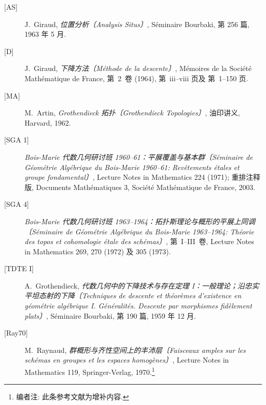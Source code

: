 \begin{description}
  \item[{[AS]}] J.~Giraud, \emph{位置分析〔Analysis Situs〕}, S\'eminaire Bourbaki,
    第 256 篇, 1963 年 5 月.

  \item[{[D]}] J.~Giraud, \emph{下降方法〔M\'ethode de la descente〕}, M\'emoires de la
    Soci\'et\'e Math\'ematique de France, 第~2~卷 (1964), 第~iii--viii 页及
    第~1--150 页.

  \item[{[MA]}] M.~Artin, \emph{Grothendieck 拓扑〔Grothendieck Topologies〕}, 油印讲义,
    Harvard, 1962.

  \item[{[SGA 1]}] \emph{Bois-Marie 代数几何研讨班 1960--61：平展覆盖与基本群〔S\'eminaire de G\'eom\'etrie Alg\'ebrique du
    Bois-Marie 1960--61: Rev\^etements \'etales et groupe fondamental〕},
    Lecture Notes in Mathematics 224 (1971); 重排注释版,
    Documents Math\'ematiques 3, Soci\'et\'e Math\'ematique de
    France, 2003.

  \item[{[SGA 4]}] \emph{Bois-Marie 代数几何研讨班 1963--1964：拓扑斯理论与概形的平展上同调〔S\'eminaire de G\'eom\'etrie Alg\'ebrique du
    Bois-Marie 1963--1964: Th\'eorie des topos et cohomologie \'etale des
    sch\'emas〕}, 第~I--III~卷, Lecture Notes in Mathematics 269, 270 (1972)
    及 305 (1973).

  \item[{[TDTE I]}] A.~Grothendieck, \emph{代数几何中的下降技术与存在定理 I：一般理论；沿忠实平坦态射的下降〔Techniques de descente et
    th\'eor\`emes d'existence en g\'eom\'etrie alg\'ebrique I.
    G\'en\'eralit\'es. Descente par morphismes fid\`element plats〕},
    S\'eminaire Bourbaki, 第 190 篇, 1959 年 12 月.

  \item[{[Ray70]}] M.~Raynaud, \emph{群概形与齐性空间上的丰沛层〔Faisceaux amples sur les sch\'emas en
    groupes et les espaces homog\`enes〕}, Lecture Notes in Mathematics 119,
    Springer-Verlag, 1970.\footnote{编者注: 此条参考文献为增补内容.}
\end{description}

